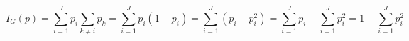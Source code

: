   
$$ I_{G}(p)  = \sum_{i=1}^{J} p_{i} \sum_{k \neq i} p_{k} = \sum_{i=1}^{J} p_{i}(1-p_{i}) = \sum_{i=1}^{J} (p_{i} - p_{i}^2) = \sum_{i=1}^{J} p_{i} - \sum_{i=1}^{J} p_{i}^2 = 1 - \sum_{i=1}^{J} p_{i}^2 $$

